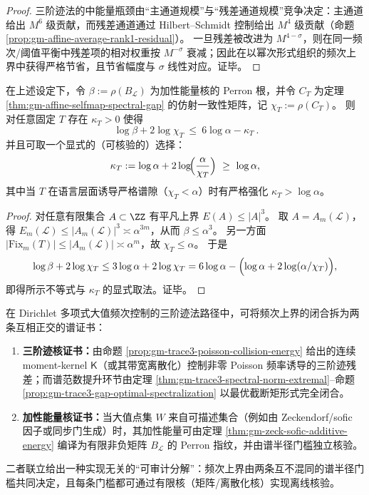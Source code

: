 \begin{proof}
三阶迹法的中能量瓶颈由“主通道规模”与“残差通道规模”竞争决定：主通道给出 \(M^6\) 级贡献，而残差通道通过 Hilbert--Schmidt 控制给出 \(M^4\) 级贡献（命题 \ref{prop:gm-affine-average-rank1-residual}）。
一旦残差被改进为 \(M^{4-\sigma}\)，则在同一频次/阈值平衡中残差项的相对权重按 \(M^{-\sigma}\) 衰减；因此在以幂次形式组织的频次上界中获得严格节省，且节省幅度与 \(\sigma\) 线性对应。证毕。
\end{proof}

\begin{proposition}\label{prop:gm-energy-affine-complementarity}
在上述设定下，令 \(\beta:=\rho(B_{\mathcal{L}})\) 为加性能量核的 Perron 根，并令 \(C_T\) 为定理 \ref{thm:gm-affine-selfmap-spectral-gap} 的仿射一致性矩阵，记 \(\chi_T:=\rho(C_T)\)。
则对任意固定 \(T\) 存在 \(\kappa_T>0\) 使得
\[
\boxed{\ \log\beta+2\log\chi_T\ \le\ 6\log\alpha-\kappa_T\ }.
\]
并且可取一个显式的（可核验的）选择：
\[
\kappa_T:=\log\alpha+2\log\!\Bigl(\frac{\alpha}{\chi_T}\Bigr)\ \ge\ \log\alpha,
\]
其中当 \(T\) 在语言层面诱导严格谱隙（\(\chi_T<\alpha\)）时有严格强化 \(\kappa_T>\log\alpha\)。
\end{proposition}

\begin{proof}
对任意有限集合 \(A\subset\ZZ\) 有平凡上界 \(E(A)\le |A|^3\)。
取 \(A=A_m(\mathcal{L})\)，得 \(E_m(\mathcal{L})\le |A_m(\mathcal{L})|^3\asymp \alpha^{3m}\)，从而 \(\beta\le \alpha^3\)。
另一方面 \(|\mathrm{Fix}_m(T)|\le |A_m(\mathcal{L})|\asymp \alpha^m\)，故 \(\chi_T\le \alpha\)。
于是
\[
\log\beta+2\log\chi_T
\le 3\log\alpha+2\log\chi_T
=6\log\alpha-\Bigl(\log\alpha+2\log(\alpha/\chi_T)\Bigr),
\]
即得所示不等式与 \(\kappa_T\) 的显式取法。证毕。
\end{proof}

\begin{theorem}\label{thm:gm-dual-spectral-certificates}
在 Dirichlet 多项式大值频次控制的三阶迹法路径中，可将频次上界的闭合拆为两条互相正交的谱证书：
\begin{enumerate}
  \item \textbf{三阶迹核证书：}由命题 \ref{prop:gm-trace3-poisson-collision-energy} 给出的连续 moment-kernel \(\mathsf{K}\)（或其带宽离散化）控制非零 Poisson 频率诱导的三阶迹残差；而谱范数提升环节由定理 \ref{thm:gm-trace3-spectral-norm-extremal}--命题 \ref{prop:gm-trace3-gap-optimal-spectralization} 以最优截断矩形式完全闭合。
  \item \textbf{加性能量核证书：}当大值点集 \(W\) 来自可描述集合（例如由 Zeckendorf/sofic 因子或同步门生成）时，其加性能量可由定理 \ref{thm:gm-zeck-sofic-additive-energy} 编译为有限非负矩阵 \(B_{\mathcal{L}}\) 的 Perron 指纹，并由谱半径门槛独立核验。
\end{enumerate}
二者联立给出一种实现无关的“可审计分解”：频次上界由两条互不混同的谱半径门槛共同决定，且每条门槛都可通过有限核（矩阵/离散化核）实现离线核验。
\end{theorem}

